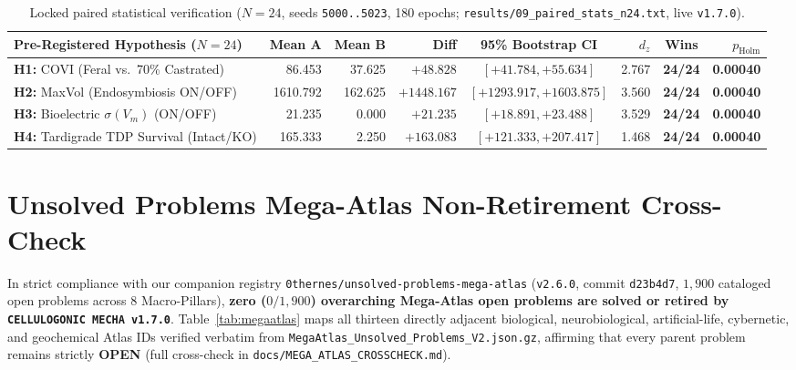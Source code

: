 \documentclass[11pt,reqno]{amsart}
\theoremstyle{plain}
\theoremstyle{definition}
\theoremstyle{remark}
\newcommand{\code}[1]{{\footnotesize\nolinkurl{#1}}}
\begin{document}
\begin{table}[ht]
\centering
\caption{Locked paired statistical verification ($N = 24$, seeds \texttt{5000..5023}, 180 epochs; \code{results/09_paired_stats_n24.txt}, live \texttt{v1.7.0}).}
\label{tab:stats}
\scriptsize
\setlength{\tabcolsep}{2.8pt}
\begin{tabular}{@{} l r r r c r c r @{}}
\toprule
\textbf{Pre-Registered Hypothesis ($N = 24$)} & \textbf{Mean A} & \textbf{Mean B} & \textbf{Diff} & \textbf{95\% Bootstrap CI} & $d_z$ & \textbf{Wins} & $p_{\mathrm{Holm}}$ \\
\midrule
\textbf{H1:} COVI (Feral vs.\ 70\% Castrated)         &   86.453 &  37.625 &   $+48.828$ & $[+41.784, +55.634]$    & 2.767 & \textbf{24/24} & \textbf{0.00040} \\
\textbf{H2:} MaxVol (Endosymbiosis ON/OFF)            & 1610.792 & 162.625 & $+1448.167$ & $[+1293.917, +1603.875]$ & 3.560 & \textbf{24/24} & \textbf{0.00040} \\
\textbf{H3:} Bioelectric $\sigma(V_m)$ (ON/OFF)       &   21.235 &   0.000 &   $+21.235$ & $[+18.891, +23.488]$    & 3.529 & \textbf{24/24} & \textbf{0.00040} \\
\textbf{H4:} Tardigrade TDP Survival (Intact/KO)      &  165.333 &   2.250 &  $+163.083$ & $[+121.333, +207.417]$  & 1.468 & \textbf{24/24} & \textbf{0.00040} \\
\bottomrule
\end{tabular}
\end{table}

\section{Unsolved Problems Mega-Atlas Non-Retirement Cross-Check}
\label{sec:megaatlas}

In strict compliance with our companion registry \code{0thernes/unsolved-problems-mega-atlas} (\texttt{v2.6.0}, commit \texttt{d23b4d7}, $1{,}900$ cataloged open problems across $8$ Macro-Pillars), \textbf{zero ($0 / 1{,}900$) overarching Mega-Atlas open problems are solved or retired by \texttt{CELLULOGONIC MECHA v1.7.0}}. Table~\ref{tab:megaatlas} maps all thirteen directly adjacent biological, neurobiological, artificial-life, cybernetic, and geochemical Atlas IDs verified verbatim from \code{MegaAtlas_Unsolved_Problems_V2.json.gz}, affirming that every parent problem remains strictly \textbf{OPEN} (full cross-check in \code{docs/MEGA_ATLAS_CROSSCHECK.md}).
\end{document}
